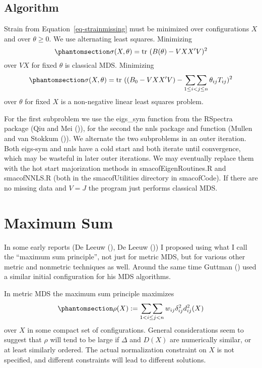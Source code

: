 \documentclass[
  12pt,
  letterpaper,
  DIV=11,
  numbers=noendperiod]{scrartcl}
\newcommand{\sectionbreak}{\clearpage}
\begin{document}
\subsection{Algorithm}\label{algorithm}

Strain from Equation~\ref{eq-strainmissing} must be minimized over
configurations \(X\) and over \(\theta\geq 0\). We use alternating least
squares. Minimizing \begin{equation}\phantomsection\label{eq-torgcomp1}{
\sigma(X,\theta)=\text{tr}\ (B(\theta)-VXX'V)^2
}\end{equation} over \(VX\) for fixed \(\theta\) is classical MDS.
Minimizing \begin{equation}\phantomsection\label{eq-torgcomp2}{
\sigma(X,\theta)=\text{tr}\ ((B_0-VXX'V)-\mathop{\sum\sum}_{1\leq i<j\leq n}\theta_{ij}T_{ij})^2
}\end{equation} over \(\theta\) for fixed \(X\) is a non-negative linear
least squares problem.

For the first subproblem we use the eigs\_sym function from the RSpectra
package (Qiu and Mei ()), for the second
the nnls package and function (Mullen and van Stokkum
()). We alternate the two
subproblems in an outer iteration. Both eigs-sym and nnls have a cold
start and both iterate until convergence, which may be wasteful in later
outer iterations. We may eventually replace them with the hot start
majorization methods in smacofEigenRoutines.R and smacofNNLS.R (both in
the smacofUtilities directory in smacofCode). If there are no missing
data and \(V=J\) the program just performs classical MDS.

\sectionbreak

\section{Maximum Sum}\label{maximum-sum}

In some early reports (De Leeuw (),
De Leeuw ()) I proposed using what I
call the ``maximum sum principle'', not just for metric MDS, but for
various other metric and nonmetric techniques as well. Around the same
time Guttman () used a similar initial
configuration for his MDS algorithms.

In metric MDS the maximum sum principle maximizes
\begin{equation}\phantomsection\label{eq-rhodef}{
\rho(X):=\mathop{\sum\sum}_{1<i\leq j<n}w_{ij}\delta_{ij}^2d_{ij}^2(X)
}\end{equation} over \(X\) in some compact set of configurations.
General considerations seem to suggest that \(\rho\) will tend to be
large if \(\Delta\) and \(D(X)\) are numerically similar, or at least
similarly ordered. The actual normalization constraint on \(X\) is not
specified, and different constraints will lead to different solutions.
\end{document}
